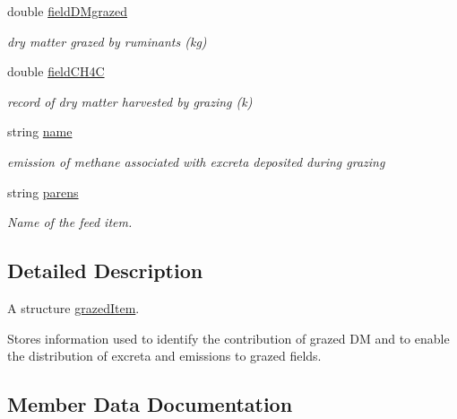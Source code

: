 \begin{DoxyCompactItemize}
double \mbox{\hyperlink{struct_global_vars_1_1grazed_item_af09ff57a40138d2ab7f7bccaec221206}{field\+D\+Mgrazed}}
\begin{DoxyCompactList}\small\item\em dry matter grazed by ruminants (kg) \end{DoxyCompactList}\item 
\mbox{\label{struct_global_vars_1_1grazed_item_a1a29ee25c3e36aefdcf9aa5a7a432132}} 
double \mbox{\hyperlink{struct_global_vars_1_1grazed_item_a1a29ee25c3e36aefdcf9aa5a7a432132}{field\+C\+H4C}}
\begin{DoxyCompactList}\small\item\em record of dry matter harvested by grazing (k) \end{DoxyCompactList}\item 
\mbox{\label{struct_global_vars_1_1grazed_item_a90bd7ad02315379fdb3a9873c4f73bd9}} 
string \mbox{\hyperlink{struct_global_vars_1_1grazed_item_a90bd7ad02315379fdb3a9873c4f73bd9}{name}}
\begin{DoxyCompactList}\small\item\em emission of methane associated with excreta deposited during grazing \end{DoxyCompactList}\item 
string \mbox{\hyperlink{struct_global_vars_1_1grazed_item_ad571e8aafded85c7897e3d27d2525ecc}{parens}}
\begin{DoxyCompactList}\small\item\em Name of the feed item. \end{DoxyCompactList}\end{DoxyCompactItemize}


\subsection{Detailed Description}
A structure \mbox{\hyperlink{struct_global_vars_1_1grazed_item}{grazed\+Item}}. 

Stores information used to identify the contribution of grazed DM and to enable the distribution of excreta and emissions to grazed fields. 

\subsection{Member Data Documentation}
\mbox{\label{struct_global_vars_1_1grazed_item_ad571e8aafded85c7897e3d27d2525ecc}} 
